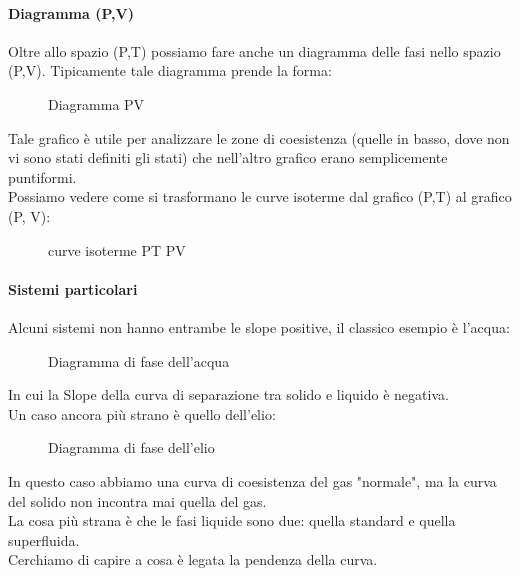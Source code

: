 \paragraph{Diagramma (P,V)}%
Oltre allo spazio (P,T) possiamo fare anche un diagramma delle fasi nello spazio (P,V). Tipicamente tale diagramma prende la forma:
\begin{figure}[H]
    \centering
    \caption{Diagramma PV}
    \label{fig:diagramma-pv}
\end{figure}
\noindent
Tale grafico è utile per analizzare le zone di coesistenza (quelle in basso, dove non vi sono stati definiti gli stati) che nell'altro grafico erano semplicemente puntiformi.\\
Possiamo vedere come si trasformano le curve isoterme dal grafico (P,T) al grafico (P, V):
\begin{figure}[H]
    \centering
    \caption{curve isoterme PT PV}
    \label{fig:curve-isoterme-pt-pv}
\end{figure}
\noindent

\paragraph{Sistemi particolari}%
Alcuni sistemi non hanno entrambe le slope positive, il classico esempio è l'acqua:
\begin{figure}[H]
    \centering
    \caption{Diagramma di fase dell'acqua}
    \label{fig:diagramma-di-fase-dell'acqua}
\end{figure}
\noindent
In cui la Slope della curva di separazione tra solido e liquido è negativa.\\
Un caso ancora più strano è quello dell'elio:
\begin{figure}[H]
    \centering
    \caption{Diagramma di fase dell'elio}
    \label{fig:diagramma-di-fase-dell'elio}
\end{figure}
\noindent
In questo caso abbiamo una curva di coesistenza del gas "normale", ma la curva del solido non incontra mai quella del gas. \\
La cosa più strana è che le fasi liquide sono due: quella standard e quella superfluida.\\
Cerchiamo di capire a cosa è legata la pendenza della curva.
